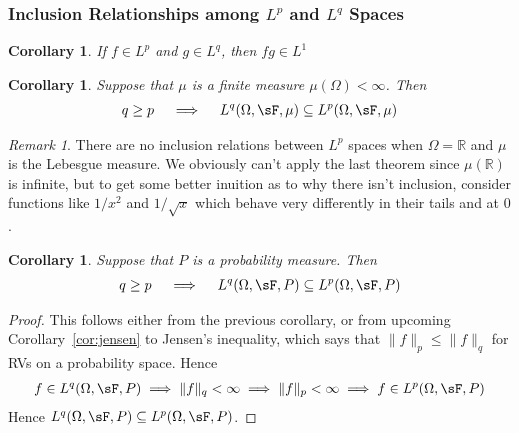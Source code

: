 \documentclass[12pt]{article}
\theoremstyle{plain}
\newtheorem{cor}[thm]{Corollary}
\theoremstyle{definition}
\theoremstyle{remark}
\newtheorem*{rmk}{Remark}
\begin{document}
\subsubsection{Inclusion Relationships among $L^p$ and $L^q$ Spaces}


\begin{cor}
    If $f\in L^p$ and $g\in L^{q}$, then $fg\in L^1$

\end{cor}


\begin{cor}
Suppose that $\mu$ is a finite measure $\mu(\Omega)<\infty$.
Then
\begin{align*}
  q \geq p
  \quad\implies\quad
  L^q(\Omega,\sF,\mu)
  \subseteq
  L^p(\Omega,\sF,\mu)
\end{align*}
\end{cor}
\begin{rmk}
There are no inclusion relations between $L^p$ spaces when
$\Omega=\mathbb{R}$ and $\mu$ is the Lebesgue measure. We obviously
can't apply the last theorem since $\mu(\mathbb{R})$ is infinite, but to
get some better inuition as to why there isn't inclusion, consider
functions like $1/x^2$ and $1/\sqrt{x}$ which behave very differently in
their tails and at $0$.
\end{rmk}

\begin{cor}
\label{cor:Lpinclusion}
Suppose that $P$ is a probability measure. Then
\begin{align*}
  q \geq p
  \quad\implies\quad
  L^q(\Omega,\sF,P)
  \subseteq
  L^p(\Omega,\sF,P)
\end{align*}
\end{cor}
\begin{proof}
This follows either from the previous corollary, or from upcoming
Corollary~\ref{cor:jensen} to Jensen's inequality, which says that
$\lVert f\rVert_p\leq \lVert f\rVert_q$
for RVs on a probability space.
Hence
\begin{align*}
  f\in L^q(\Omega,\sF,P)
  \implies
  \lVert f\rVert_q
  < \infty
  \implies
  \lVert f\rVert_p
  < \infty
  \implies
  f\in L^p(\Omega,\sF,P)
\end{align*}
Hence $L^q(\Omega,\sF,P)\subseteq L^p(\Omega,\sF,P)$.
\end{proof}
\end{document}

